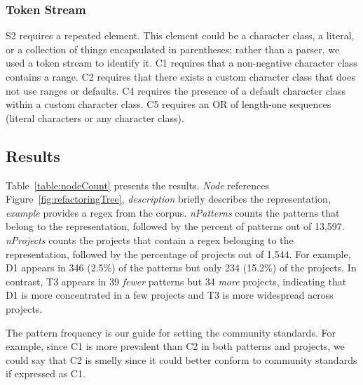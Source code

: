 \subsubsection{Token Stream }
S2 requires a repeated element. This element could be a character class, a literal, or a collection of things encapsulated in parentheses; rather than a parser, we used a token stream to identify it.
C1 requires that a non-negative character class contains a range.
C2 requires that there exists a custom character class that does not use ranges or defaults.
C4 requires the presence of a default character class within a custom character class.
C5 requires an OR of length-one sequences (literal characters or any character class).


\subsection{Results}
Table~\ref{table:nodeCount} presents the results.
 \emph{Node} references Figure~\ref{fig:refactoringTree}, \emph{description} briefly describes the representation, \emph{example} provides a regex from the corpus. \emph{nPatterns} counts the patterns that belong to the representation, followed by the percent of patterns out of 13,597.
 \emph{nProjects} counts the projects that contain a regex belonging to the representation,
followed by the percentage of projects out of 1,544.
For example, D1 appears in 346 (2.5\%) of the patterns but only 234 (15.2\%) of the projects.
 In contrast, T3 appears in 39 \emph{fewer} patterns but 34 \emph{more} projects, indicating that D1 is more concentrated in a few projects and T3 is more widespread across projects.

The pattern frequency is our guide for setting the community standards.
For example, since C1 is more prevalent than C2 in both patterns and projects, we could say that C2 is smelly since it could better conform to community standards if expressed as C1.

